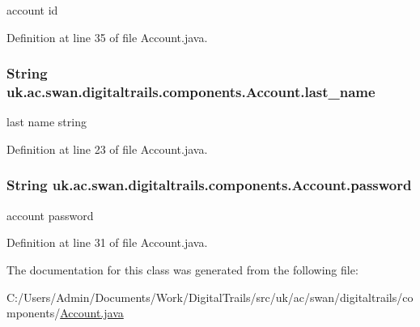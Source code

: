 account id 



Definition at line 35 of file Account.\+java.

\hypertarget{classuk_1_1ac_1_1swan_1_1digitaltrails_1_1components_1_1_account_a30eb77af35d518d869fb6cae590151e0}{
\subsubsection[{last\+\_\+name}]{\setlength{\rightskip}{0pt plus 5cm}String uk.\+ac.\+swan.\+digitaltrails.\+components.\+Account.\+last\+\_\+name}}\label{classuk_1_1ac_1_1swan_1_1digitaltrails_1_1components_1_1_account_a30eb77af35d518d869fb6cae590151e0}


last name string 



Definition at line 23 of file Account.\+java.

\hypertarget{classuk_1_1ac_1_1swan_1_1digitaltrails_1_1components_1_1_account_a7a421a5b7ed69b2841fc0054e807f01f}{
\subsubsection[{password}]{\setlength{\rightskip}{0pt plus 5cm}String uk.\+ac.\+swan.\+digitaltrails.\+components.\+Account.\+password}}\label{classuk_1_1ac_1_1swan_1_1digitaltrails_1_1components_1_1_account_a7a421a5b7ed69b2841fc0054e807f01f}


account password 



Definition at line 31 of file Account.\+java.



The documentation for this class was generated from the following file\+:\begin{DoxyCompactItemize}
\item 
C\+:/\+Users/\+Admin/\+Documents/\+Work/\+Digital\+Trails/src/uk/ac/swan/digitaltrails/components/\hyperlink{_account_8java}{Account.\+java}\end{DoxyCompactItemize}
